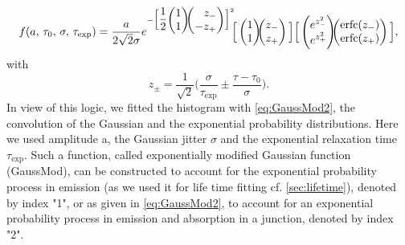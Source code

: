 \begin{equation}\label{eq:GaussMod2}
f(a,\, \tau_0,\, \sigma,\, \tau_\mathrm{exp})=\dfrac{a}{2\sqrt{2}\sigma}e^{-\Big[
		\dfrac{1}{2}\begin{pmatrix}
			1 \\
			1 \\
		\end{pmatrix}
	\hspace{-3pt}
		\begin{pmatrix}
			\,\,\,\,\, z_{-}\\
			-z_{+}\\
		\end{pmatrix}\Big]^2}\hspace{-3pt}\Big[
	\begin{pmatrix}
		1\\
		1\\
	\end{pmatrix}
\hspace{-5pt}
	\begin{pmatrix}
		z_{-}\\
		z_{+}\\
	\end{pmatrix}\Big]\Big[
	\begin{pmatrix}
		e^{z^2_{-}}\\
		e^{z^2_{+}}\\
	\end{pmatrix}
\hspace{-5pt}
	\begin{pmatrix}
		\mathrm{erfc}(z_{-})\\
		\mathrm{erfc}(z_{+})\\
	\end{pmatrix}\Big],
\end{equation}
with
\begin{equation}\label{eq:GaussMod2zeta}
	z_{\pm}=\dfrac{1}{\sqrt{2}}\Big(\dfrac{\sigma}{\tau_\mathrm{exp}}\pm\dfrac{\tau-\tau_0}{\sigma}\Big).
\end{equation}
 In view of this logic, we fitted the histogram with \cref{eq:GaussMod2}, the convolution of the Gaussian and the exponential probability distributions. Here we used amplitude a, the Gaussian jitter $\sigma$ and the exponential relaxation time $\tau_\mathrm{exp}$. Such a function, called exponentially modified Gaussian function (GaussMod), can be constructed to account for the exponential probability process in emission (as we used it for life time fitting cf. \cref{sec:lifetime}), denoted by index "1", or as given in \cref{eq:GaussMod2}, to account for an exponential probability process in emission and absorption in a junction, denoted by index "2".
